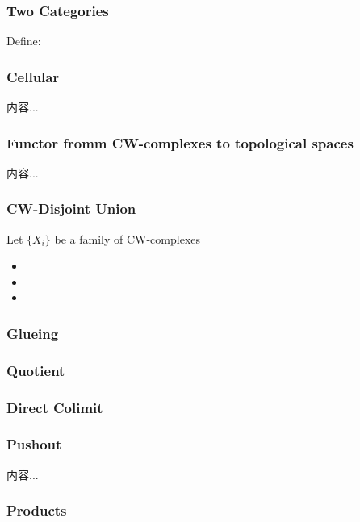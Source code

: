 \documentclass[Total.tex]{subfiles}
\begin{document}
	\subsubsection{Two Categories}
		\begin{Def}
			Define:
		\end{Def}
	\subsubsection{Cellular}
		\begin{Def}
			内容...
		\end{Def}
	\subsubsection{Functor fromm CW-complexes to topological spaces}
		\begin{lemma}
			内容...
		\end{lemma}
	\subsubsection{CW-Disjoint Union}
	\begin{proposition}
		Let $\{X_i\}$ be a family of CW-complexes
		\begin{itemize}
			\item 
			\item 
			\item 
		\end{itemize}
	\end{proposition}
	\subsubsection{Glueing}
	\subsubsection{Quotient}
	\subsubsection{Direct Colimit}
	\subsubsection{Pushout}
	\begin{Def}
		内容...
	\end{Def}
	\subsubsection{Products}
\end{document}
